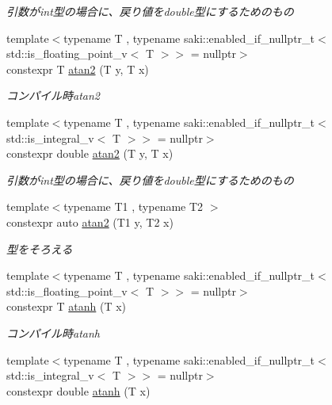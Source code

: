 \begin{DoxyCompactItemize}
\begin{DoxyCompactList}\small\item\em 引数がint型の場合に、戻り値をdouble型にするためのもの \end{DoxyCompactList}\item 
{\footnotesize template$<$typename T , typename saki\+::enabled\+\_\+if\+\_\+nullptr\+\_\+t$<$ std\+::is\+\_\+floating\+\_\+point\+\_\+v$<$ T $>$$>$  = nullptr$>$ }\\constexpr T \mbox{\hyperlink{namespacesaki_ac528a4ab6013623bfe6257229e302015}{atan2}} (T y, T x)
\begin{DoxyCompactList}\small\item\em コンパイル時atan2 \end{DoxyCompactList}\item 
{\footnotesize template$<$typename T , typename saki\+::enabled\+\_\+if\+\_\+nullptr\+\_\+t$<$ std\+::is\+\_\+integral\+\_\+v$<$ T $>$$>$  = nullptr$>$ }\\constexpr double \mbox{\hyperlink{namespacesaki_a1f8c6dc6223b790f6d227c8d22cf8b86}{atan2}} (T y, T x)
\begin{DoxyCompactList}\small\item\em 引数がint型の場合に、戻り値をdouble型にするためのもの \end{DoxyCompactList}\item 
{\footnotesize template$<$typename T1 , typename T2 $>$ }\\constexpr auto \mbox{\hyperlink{namespacesaki_a5c656a9f2a0c0cfe522fb95ac37128cc}{atan2}} (T1 y, T2 x)
\begin{DoxyCompactList}\small\item\em 型をそろえる \end{DoxyCompactList}\item 
{\footnotesize template$<$typename T , typename saki\+::enabled\+\_\+if\+\_\+nullptr\+\_\+t$<$ std\+::is\+\_\+floating\+\_\+point\+\_\+v$<$ T $>$$>$  = nullptr$>$ }\\constexpr T \mbox{\hyperlink{namespacesaki_adbfceeab527c51676d00fae31e077dcf}{atanh}} (T x)
\begin{DoxyCompactList}\small\item\em コンパイル時atanh \end{DoxyCompactList}\item 
{\footnotesize template$<$typename T , typename saki\+::enabled\+\_\+if\+\_\+nullptr\+\_\+t$<$ std\+::is\+\_\+integral\+\_\+v$<$ T $>$$>$  = nullptr$>$ }\\constexpr double \mbox{\hyperlink{namespacesaki_a1b7d87f99b61600e1201b10de467200f}{atanh}} (T x)

\end{DoxyCompactItemize}

